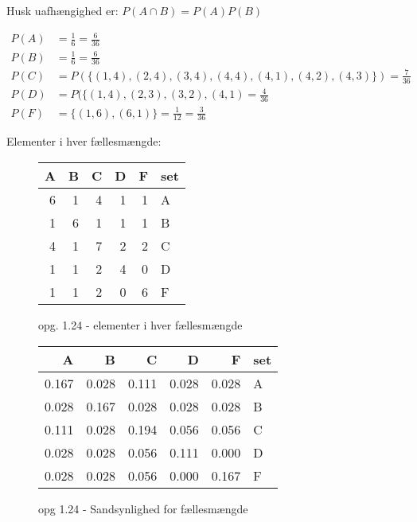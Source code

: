 Husk uafhængighed er: $P(A \cap B) = P(A)P(B)$

\begin{align}
    P(A) &= \frac{1}{6} = \frac{6}{36}\\
    P(B) &= \frac{1}{6} = \frac{6}{36} \\
    P(C) &= P(\{(1,4),(2,4),(3,4),(4,4), (4,1),(4,2),(4,3)\})= \frac{7}{36} \\
    P(D) &= P(\{(1,4),(2,3),(3,2),(4,1)=\frac{4}{36} \\
    P(F) &= \{(1,6),(6,1) \} = \frac{1}{12}= \frac{3}{36}
\end{align}

Elementer i hver fællesmængde:

\begin{figure}[ht]
    \centering
        \begin{tabular}{rrrrrl}
        \toprule
         A &  B &  C &  D &  F & set \\
        \midrule
         6 &  1 &  4 &  1 &  1 &   A \\
         1 &  6 &  1 &  1 &  1 &   B \\
         4 &  1 &  7 &  2 &  2 &   C \\
         1 &  1 &  2 &  4 &  0 &   D \\
         1 &  1 &  2 &  0 &  6 &   F \\
        \bottomrule
        \end{tabular}
    \caption{opg. 1.24 - elementer i hver fællesmængde}
    \label{tab:1.24}
\end{figure}

\newpage

\begin{figure}[ht]
    \centering
        \begin{tabular}{rrrrrl}
        \toprule
             A &      B &      C &      D &      F & set \\
        \midrule
         0.167 &  0.028 &  0.111 &  0.028 &  0.028 &   A \\
         0.028 &  0.167 &  0.028 &  0.028 &  0.028 &   B \\
         0.111 &  0.028 &  0.194 &  0.056 &  0.056 &   C \\
         0.028 &  0.028 &  0.056 &  0.111 &  0.000 &   D \\
         0.028 &  0.028 &  0.056 &  0.000 &  0.167 &   F \\
        \bottomrule
        \end{tabular}
    \caption{opg 1.24 - Sandsynlighed for fællesmængde}
    \label{tab:1.24-probs}
\end{figure}


